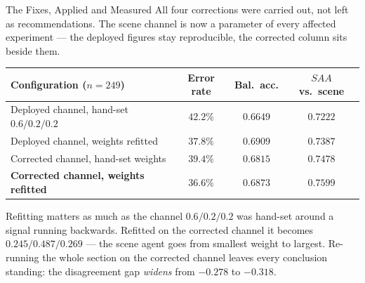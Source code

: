 \documentclass[aspectratio=169,11pt]{beamer}
\begin{document}
\begin{frame}{The Fixes, Applied and Measured}
\small
All four corrections were carried out, not left as recommendations. The scene channel is now a parameter of every affected experiment --- the deployed figures stay reproducible, the corrected column sits beside them.
\vspace{1mm}
\begin{center}
\scriptsize
\begin{tabular}{@{}l c c c@{}}
\toprule
\textbf{Configuration} ($n=249$) & \textbf{Error rate} & \textbf{Bal.\ acc.} & \textbf{$SAA$ vs.\ scene} \\
\midrule
Deployed channel, hand-set $0.6/0.2/0.2$ & $42.2\%$ & $0.6649$ & $0.7222$ \\
Deployed channel, weights refitted & $37.8\%$ & $0.6909$ & $0.7387$ \\
Corrected channel, hand-set weights & $39.4\%$ & $0.6815$ & $0.7478$ \\
\textbf{Corrected channel, weights refitted} & $\mathbf{36.6\%}$ & $0.6873$ & $\mathbf{0.7599}$ \\
\bottomrule
\end{tabular}
\end{center}
\vspace{1mm}
\begin{block}{\small Refitting matters as much as the channel}
\footnotesize $0.6/0.2/0.2$ was hand-set around a signal running backwards. Refitted on the corrected channel it becomes $\mathbf{0.245/0.487/0.269}$ --- the scene agent goes from smallest weight to largest. Re-running the whole section on the corrected channel leaves every conclusion standing: the disagreement gap \emph{widens} from $-0.278$ to $\mathbf{-0.318}$.
\end{block}
\end{frame}
\end{document}
